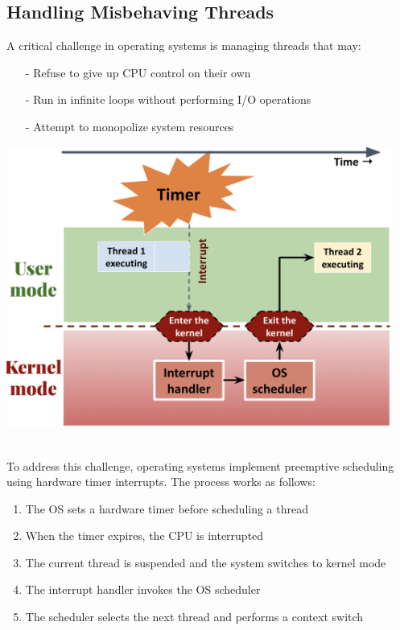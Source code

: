 \documentclass[../../compsys.tex]{subfiles}
\begin{document}
\subsection{Handling Misbehaving Threads}
A critical challenge in operating systems is managing threads that may:

    \begin{minipage}[htp]{0.45\textwidth}
        \begin{itemize}
            \item[-] Refuse to give up CPU control on their own
            \item[-] Run in infinite loops without performing I/O operations
            \item[-] Attempt to monopolize system resources
        \end{itemize}
    \end{minipage}
    \hfill
    \begin{minipage}[htp]{0.45\textwidth}
        \centering
        \includegraphics[width=0.95\textwidth]{images/misbehaving_threads.png}
\end{minipage}\\[5px]

To address this challenge, operating systems implement preemptive scheduling using hardware timer interrupts.
The process works as follows:
\begin{enumerate}
    \item The OS sets a hardware timer before scheduling a thread
    \item When the timer expires, the CPU is interrupted
    \item The current thread is suspended and the system switches to kernel mode
    \item The interrupt handler invokes the OS scheduler
    \item The scheduler selects the next thread and performs a context switch
\end{enumerate}
\end{document}

